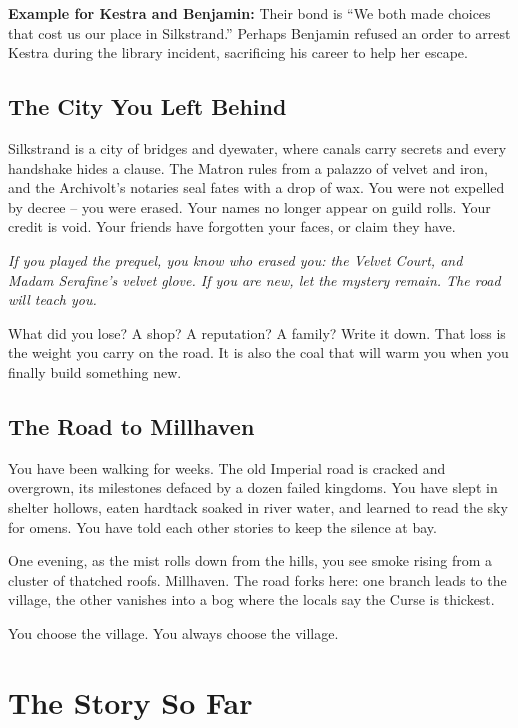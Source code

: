 \documentclass[11pt]{article}
\begin{document}
\textbf{Example for Kestra and Benjamin:} Their bond is ``We both made choices that cost us our place in Silkstrand.'' Perhaps Benjamin refused an order to arrest Kestra during the library incident, sacrificing his career to help her escape.

\subsection{The City You Left Behind}

Silkstrand is a city of bridges and dyewater, where canals carry secrets and every handshake hides a clause. The Matron rules from a palazzo of velvet and iron, and the Archivolt's notaries seal fates with a drop of wax. You were not expelled by decree -- you were erased. Your names no longer appear on guild rolls. Your credit is void. Your friends have forgotten your faces, or claim they have.

\noindent \textit{If you played the prequel, you know who erased you: the Velvet Court, and Madam Serafine's velvet glove. If you are new, let the mystery remain. The road will teach you.}

What did you lose? A shop? A reputation? A family? Write it down. That loss is the weight you carry on the road. It is also the coal that will warm you when you finally build something new.

\subsection{The Road to Millhaven}

You have been walking for weeks. The old Imperial road is cracked and overgrown, its milestones defaced by a dozen failed kingdoms. You have slept in shelter hollows, eaten hardtack soaked in river water, and learned to read the sky for omens. You have told each other stories to keep the silence at bay.

One evening, as the mist rolls down from the hills, you see smoke rising from a cluster of thatched roofs. Millhaven. The road forks here: one branch leads to the village, the other vanishes into a bog where the locals say the Curse is thickest.

You choose the village. You always choose the village.

\section{The Story So Far}
\end{document}
